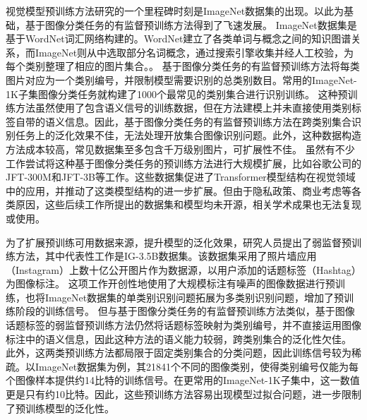 视觉模型预训练方法研究的一个里程碑时刻是ImageNet数据集\cite{deng2009imagenet}的出现。以此为基础，基于图像分类任务的有监督预训练方法得到了飞速发展\cite{alexnet,resnet,googlenet,densenet}。
ImageNet数据集是基于WordNet词汇网络\cite{miller1995wordnet}构建的。WordNet建立了各类单词与概念之间的知识图谱关系，而ImageNet则从中选取部分名词概念，通过搜索引擎收集并经人工校验，为每个类别整理了相应的图片集合。。
基于图像分类任务的有监督预训练方法将每类图片对应为一个类别编号，并限制模型需要识别的总类别数目。常用的ImageNet-1K子集图像分类任务就构建了1000个最常见的类别集合进行识别训练。
这种预训练方法虽然使用了包含语义信号的训练数据，但在方法建模上并未直接使用类别标签自带的语义信息。因此，基于图像分类任务的有监督预训练方法在跨类别集合识别任务上的泛化效果不佳\cite{imagnettransfer}，无法处理开放集合图像识别问题。此外，这种数据构造方法成本较高，常见数据集至多包含千万级别图片，可扩展性不佳。
虽然有不少工作尝试将这种基于图像分类任务的预训练方法进行大规模扩展，比如谷歌公司的JFT-300M\cite{Sun_2017_JFT300m}和JFT-3B\cite{zhai2022scaling}等工作。这些数据集促进了Transformer\cite{Transformer}模型结构在视觉领域中的应用\cite{dosovitskiy2020vit, coatnet}，并推动了这类模型结构的进一步扩展\cite{zhai2022scaling, vit22b}。但由于隐私政策、商业考虑等各类原因，这些后续工作所提出的数据集和模型均未开源，相关学术成果也无法复现或使用。

为了扩展预训练可用数据来源，提升模型的泛化效果，研究人员提出了弱监督预训练方法，其中代表性工作是IG-3.5B数据集\cite{mahajan2018exploring}。该数据集采用了照片墙应用（Instagram）上数十亿公开图片作为数据源，以用户添加的话题标签（Hashtag）为图像标注。
这项工作开创性地使用了大规模标注有噪声的图像数据进行预训练，也将ImageNet数据集的单类别识别问题拓展为多类别识别问题，增加了预训练阶段的训练信号。
但与基于图像分类任务的有监督预训练方法类似，基于图像话题标签的弱监督预训练方法仍然将话题标签映射为类别编号，并不直接运用图像标注中的语义信息，因此这种方法的语义能力较弱，跨类别集合的泛化性欠佳。
此外，这两类预训练方法都局限于固定类别集合的分类问题，因此训练信号较为稀疏。以ImageNet数据集为例，其21841个不同的图像类别，使得类别编号仅能为每个图像样本提供约14比特的训练信号。在更常用的ImageNet-1K子集中，这一数值更是只有约10比特。因此，这些预训练方法容易出现模型过拟合问题，进一步限制了预训练模型的泛化性。


